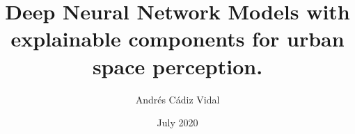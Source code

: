 \documentclass[pdftex]{pucthesis}	%
\begin{document}

\title[Deep Neural Network Models with explainable components for urban space perception.]
   {\bf Deep Neural Network Models with explainable components for urban space perception.}       
\author[Andrés Cádiz Vidal]{Andrés Cádiz Vidal}

\address{Escuela de Ingenier\'ia\\
                   Pontificia Universidad Cat\'olica de Chile\\ 
                   Vicu\~na Mackenna 4860\\
                  Santiago, Chile\\
                  {\it Tel.\/} : 56 (2) 354-2000}

\subject                            {Structural Engineering}
\date                                 {July 2020}
\dedication                      {Gratefully to my parents and siblings}


\NoChapterPageNumber
{}
\maketitle


\end{document}
